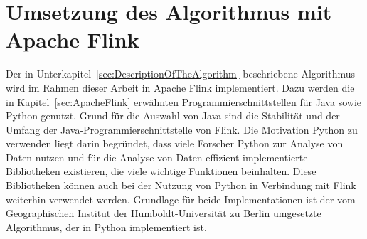 \section{Umsetzung des Algorithmus mit Apache Flink}
\label{sec:ImplementationFlinkDescription}
Der in Unterkapitel~\ref{sec:DescriptionOfTheAlgorithm} beschriebene Algorithmus wird im Rahmen dieser Arbeit in Apache Flink implementiert. Dazu werden die in Kapitel~\ref{sec:ApacheFlink} erwähnten Programmierschnittstellen für Java sowie Python genutzt. Grund für die Auswahl von Java sind die Stabilität und der Umfang der Java-Programmierschnittstelle von Flink. Die Motivation Python zu verwenden liegt darin begründet, dass viele Forscher Python zur Analyse von Daten nutzen und für die Analyse von Daten effizient implementierte Bibliotheken existieren, die viele wichtige Funktionen beinhalten. Diese Bibliotheken können auch bei der Nutzung von Python in Verbindung mit Flink weiterhin verwendet werden. Grundlage für beide Implementationen ist der vom Geographischen Institut der Humboldt-Universität zu Berlin umgesetzte Algorithmus, der in Python implementiert ist.

